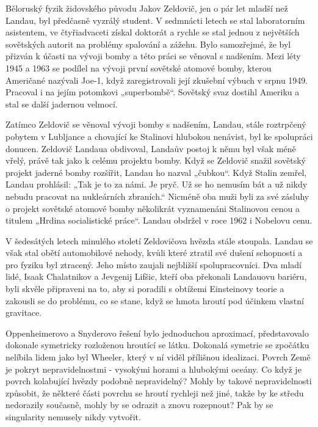   Běloruský fyzik židovského původu Jakov Zeldovič, jen o pár let mladší než Landau, byl předčasně
  vyzrálý student. V sedmnácti letech se stal laboratorním asistentem, ve čtyřiadvaceti získal
  doktorát a rychle se stal jednou z největších sovětských autorit na problémy spalování a zážehu.
  Bylo samozřejmé, že byl přizván k účasti na vývoji bomby a této práci se věnoval s nadšením. Mezi
  léty 1945 a 1963 se podílel na vývoji první sovětské atomové bomby, kterou Američané nazývali
  Joe-1, když zaregistrovali její zkušební výbuch v srpnu 1949. Pracoval i na jejím potomkovi
  „superbombě“. Sovětský svaz dostihl Ameriku a stal se další jadernou velmocí. 

  Zatímco Zeldovič se věnoval vývoji bomby s nadšením, Landau, stále roztrpčený pobytem v Lubljance
  a chovající ke Stalinovi hlubokou nenávist, byl ke spolupráci donucen. Zeldovič Landaua obdivoval,
  Landaův postoj k němu byl však méně vřelý, právě tak jako k celému projektu bomby. Když se
  Zeldovič snažil sovětský projekt jaderné bomby rozšířit, Landau ho nazval „čubkou“. Když Stalin
  zemřel, Landau prohlásil: „Tak je to za námi. Je pryč. Už se ho nemusím bát a už nikdy nebudu
  pracovat na nukleárních zbraních.“ Nicméně oba muži byli za své zásluhy o projekt sovětské atomové
  bomby několikrát vyznamenáni Stalinovou cenou a titulem „Hrdina socialistické práce“. Landau
  obdržel v roce 1962 i Nobelovu cenu. 

  V šedesátých letech minulého století Zeldovičova hvězda stále stoupala. Landau se však stal obětí
  automobilové nehody, kvůli které ztratil své dušení schopnosti a pro fyziku byl ztracený. Jeho
  místo zaujali nejbližší spolupracovníci. Dva mladí lidé, Isaak Chalatnikov a Jevgenij Lifšic,
  kteří oba překonali Landauovu bariéru, byli skvěle připraveni na to, aby si poradili s obtížemi
  Einsteinovy teorie a zakousli se do problému, co se stane, když se hmota hroutí pod účinkem
  vlastní gravitace.

  Oppenheimerovo a Snyderovo řešení bylo jednoduchou aproximací, představovalo dokonale symetricky
  rozloženou hroutící se látku. Dokonalá symetrie se zpočátku nelíbila lidem jako byl Wheeler, který
  v ní viděl přílišnou idealizaci. Povrch Země je pokryt nepravidelnostmi - vysokými horami a
  hlubokými oceány. Co když je povrch kolabující hvězdy podobně nepravidelný? Mohly by takové
  nepravidelnosti způsobit, že některé části povrchu se hroutí rychleji než jiné, takže by ke středu
  nedorazily současně, mohly by se odrazit a znovu rozepnout? Pak by se singularity nemusely nikdy
  vytvořit. 

